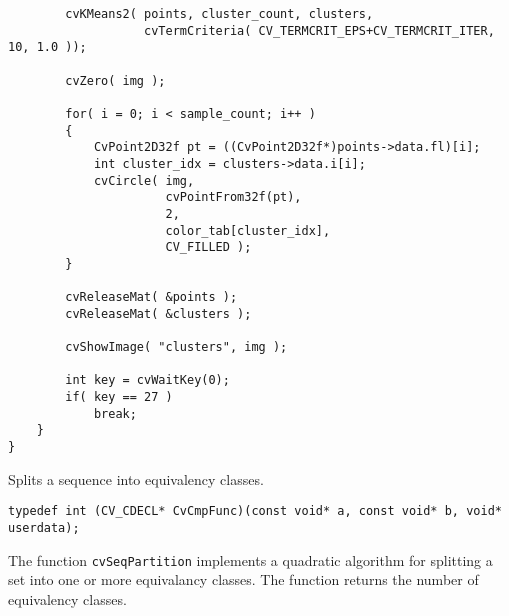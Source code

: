 \begin{lstlisting}
        cvKMeans2( points, cluster_count, clusters,
                   cvTermCriteria( CV_TERMCRIT_EPS+CV_TERMCRIT_ITER, 10, 1.0 ));

        cvZero( img );

        for( i = 0; i < sample_count; i++ )
        {
            CvPoint2D32f pt = ((CvPoint2D32f*)points->data.fl)[i];
            int cluster_idx = clusters->data.i[i];
            cvCircle( img,
                      cvPointFrom32f(pt),
                      2,
                      color_tab[cluster_idx],
                      CV_FILLED );
        }

        cvReleaseMat( &points );
        cvReleaseMat( &clusters );

        cvShowImage( "clusters", img );

        int key = cvWaitKey(0);
        if( key == 27 )
            break;
    }
}
\end{lstlisting}

Splits a sequence into equivalency classes.


\begin{description}
\end{description}

\begin{lstlisting}
typedef int (CV_CDECL* CvCmpFunc)(const void* a, const void* b, void* userdata);
\end{lstlisting}

The function \texttt{cvSeqPartition} implements a quadratic algorithm for
splitting a set into one or more equivalancy classes. The function
returns the number of equivalency classes.

